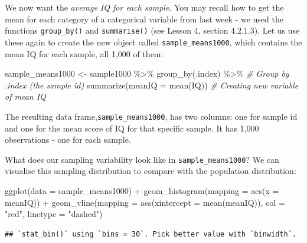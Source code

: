 \documentclass[
]{book}
\newenvironment{Shaded}{\begin{snugshade}}{\end{snugshade}}
\newcommand{\AttributeTok}[1]{\textcolor[rgb]{0.77,0.63,0.00}{#1}}
\newcommand{\CommentTok}[1]{\textcolor[rgb]{0.56,0.35,0.01}{\textit{#1}}}
\newcommand{\FunctionTok}[1]{\textcolor[rgb]{0.00,0.00,0.00}{#1}}
\newcommand{\NormalTok}[1]{#1}
\newcommand{\OtherTok}[1]{\textcolor[rgb]{0.56,0.35,0.01}{#1}}
\newcommand{\SpecialCharTok}[1]{\textcolor[rgb]{0.00,0.00,0.00}{#1}}
\newcommand{\StringTok}[1]{\textcolor[rgb]{0.31,0.60,0.02}{#1}}
\begin{document}
We now want the \emph{average IQ for each sample}. You may recall how to get the mean for each category of a categorical variable from last week - we used the functions \texttt{group\_by()} and \texttt{summarise()} (see Lesson 4, section 4.2.1.3). Let us use these again to create the new object called \texttt{sample\_means1000}, which contains the mean IQ for each sample, all 1,000 of them:

\begin{Shaded}
\begin{Highlighting}[]
\NormalTok{sample\_means1000 }\OtherTok{\textless{}{-}}\NormalTok{ sample1000 }\SpecialCharTok{\%\textgreater{}\%} 
  \FunctionTok{group\_by}\NormalTok{(.index) }\SpecialCharTok{\%\textgreater{}\%} \CommentTok{\# Group by .index  (the sample id)}
  \FunctionTok{summarize}\NormalTok{(}\AttributeTok{meanIQ =} \FunctionTok{mean}\NormalTok{(IQ)) }\CommentTok{\# Creating new variable of mean IQ}
\end{Highlighting}
\end{Shaded}

The resulting data frame,\texttt{sample\_means1000}, has two columns: one for sample id and one for the mean score of IQ for that specific sample. It has 1,000 observations - one for each sample.

What does our sampling variability look like in \texttt{sample\_means1000}? We can visualise this sampling distribution to compare with the population distribution:

\begin{Shaded}
\begin{Highlighting}[]
\FunctionTok{ggplot}\NormalTok{(}\AttributeTok{data =}\NormalTok{ sample\_means1000) }\SpecialCharTok{+} 
  \FunctionTok{geom\_histogram}\NormalTok{(}\AttributeTok{mapping =} \FunctionTok{aes}\NormalTok{(}\AttributeTok{x =}\NormalTok{ meanIQ)) }\SpecialCharTok{+} 
  \FunctionTok{geom\_vline}\NormalTok{(}\AttributeTok{mapping =} \FunctionTok{aes}\NormalTok{(}\AttributeTok{xintercept =} \FunctionTok{mean}\NormalTok{(meanIQ)), }\AttributeTok{col =} \StringTok{"red"}\NormalTok{, }\AttributeTok{linetype =} \StringTok{"dashed"}\NormalTok{)}
\end{Highlighting}
\end{Shaded}

\begin{verbatim}
## `stat_bin()` using `bins = 30`. Pick better value with `binwidth`.
\end{verbatim}
\end{document}
